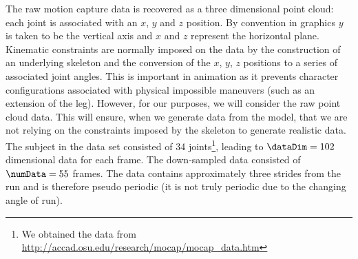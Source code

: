 The raw motion capture data is recovered as a three dimensional point
cloud: each joint is associated with an $x$, $y$ and $z$ position. By
convention in graphics $y$ is taken to be the vertical axis and $x$
and $z$ represent the horizontal plane. Kinematic constraints are
normally imposed on the data by the construction of an underlying
skeleton and the conversion of the $x$, $y$, $z$ positions to a series
of associated joint angles. This is important in animation as it
prevents character configurations associated with physical impossible
maneuvers (such as an extension of the leg). However, for our
purposes, we will consider the raw point cloud data. This will ensure,
when we generate data from the model, that we are not relying on the
constraints imposed by the skeleton to generate realistic data. The
subject in the data set consisted of 34 joints\footnote{We obtained
  the data from
  \url{http://accad.osu.edu/research/mocap/mocap_data.htm}}, leading
to $\dataDim=102$ dimensional data for each frame. The down-sampled
data consisted of $\numData=55$ frames. The data contains
approximately three strides from the run and is therefore pseudo
periodic (it is not truly periodic due to the changing angle of run).

